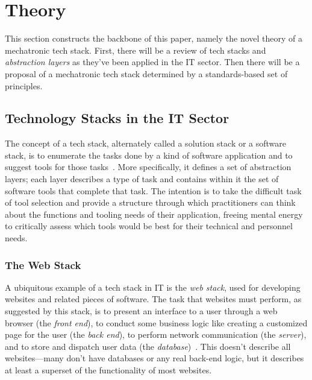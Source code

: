 \documentclass[english,12pt,a4paper,pdftex,eng,utf8]{aaltothesis}
\begin{document}
\clearpage


\section{Theory}

This section constructs the backbone of this paper, namely the novel theory of a mechatronic tech stack. First, there will be a review of tech stacks and {\it abstraction layers\/} as they've been applied in the IT sector. Then there will be a proposal of a mechatronic tech stack determined by a standards-based set of principles.

\subsection{Technology Stacks in the IT Sector}

The concept of a tech stack, alternately called a solution stack or a software stack, is to enumerate the tasks done by a kind of software application and to suggest tools for those tasks~\cite{PranamStack2017}. More specifically, it defines a set of abstraction layers; each layer describes a type of task and contains within it the set of software tools that complete that task. The intention is to take the difficult task of tool selection and provide a structure through which practitioners can think about the functions and tooling needs of their application, freeing mental energy to critically assess which tools would be best for their technical and personnel needs.

\subsubsection{The Web Stack}

A ubiquitous example of a tech stack in IT is the \textit{web stack}, used for developing websites and related pieces of software. The task that websites must perform, as suggested by this stack, is to present an interface to a user through a web browser (the \textit{front end}), to conduct some business logic like creating a customized page for the user (the \textit{back end}), to perform network communication (the \textit{server}), and to store and dispatch user data (the \textit{database})~\cite{PranamStack2017}. This doesn't describe all websites---many don't have databases or any real back-end logic, but it describes at least a superset of the functionality of most websites.
\end{document}
